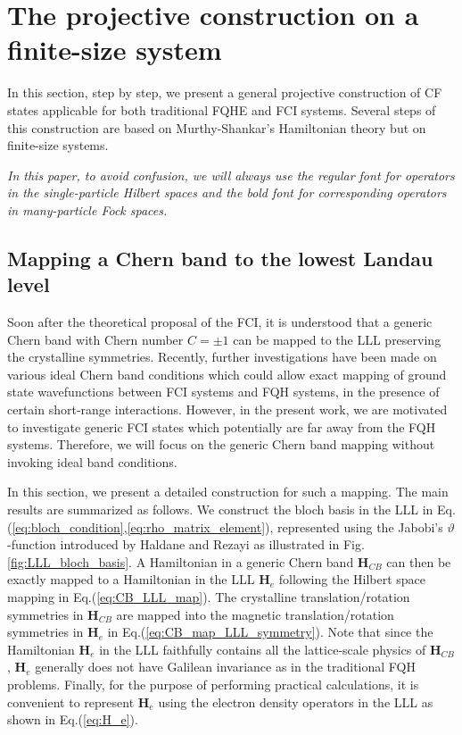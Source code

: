 \section{The projective construction on a finite-size system}\label{sec:M_S_finite}
In this section, step by step, we present a general projective construction of CF states applicable for both traditional FQHE and FCI systems. Several steps of this construction are based on Murthy-Shankar's Hamiltonian theory but on finite-size systems.

\emph{In this paper, to avoid confusion, we will always use the regular font for operators in the single-particle Hilbert spaces and the bold font for corresponding operators in many-particle Fock spaces.}

\subsection{Mapping a Chern band to the lowest Landau level}
Soon after the theoretical proposal of the FCI, it is understood that a generic Chern band with Chern number $C=\pm1$ can be mapped to the LLL preserving the crystalline symmetries\cite{qi2011generic,wu2013bloch, jian2013crystal}. Recently, further investigations have been made on various ideal Chern band conditions which could allow exact mapping of ground state wavefunctions between FCI systems and FQH systems, in the presence of certain short-range interactions\cite{roy2014band,wang2021exact,wang2023origin,estienne2023ideal,ledwith2020fractional,ledwith2023vortexability,dong2023many}. However, in the present work, we are motivated to investigate generic FCI states which potentially are far away from the FQH systems. Therefore, we will focus on the generic Chern band mapping\cite{qi2011generic,wu2013bloch, jian2013crystal} without invoking ideal band conditions.

In this section, we present a detailed construction for such a mapping. The main results are summarized as follows. We construct the bloch basis in the LLL in Eq.(\ref{eq:bloch_condition},\ref{eq:rho_matrix_element}), represented using the Jabobi's $\vartheta$-function introduced by Haldane and Rezayi\cite{haldane1985periodic} as illustrated in Fig.\ref{fig:LLL_bloch_basis}. A Hamiltonian in a generic Chern band $\mathbf H_{CB}$ can then be exactly mapped to a Hamiltonian in the LLL $\mathbf H_{e}$ following the Hilbert space mapping in Eq.(\ref{eq:CB_LLL_map}). The crystalline translation/rotation symmetries in $\mathbf H_{CB}$ are mapped into the magnetic translation/rotation symmetries in $\mathbf H_{e}$ in Eq.(\ref{eq:CB_map_LLL_symmetry}). Note that since the Hamiltonian $\mathbf H_{e}$ in the LLL faithfully contains all the lattice-scale physics of $\mathbf H_{CB}$, $\mathbf H_{e}$ generally does not have Galilean invariance as in the traditional FQH problems. Finally, for the purpose of performing practical calculations, it is convenient to represent $\mathbf H_{e}$ using the electron density operators in the LLL as shown in Eq.(\ref{eq:H_e}).

